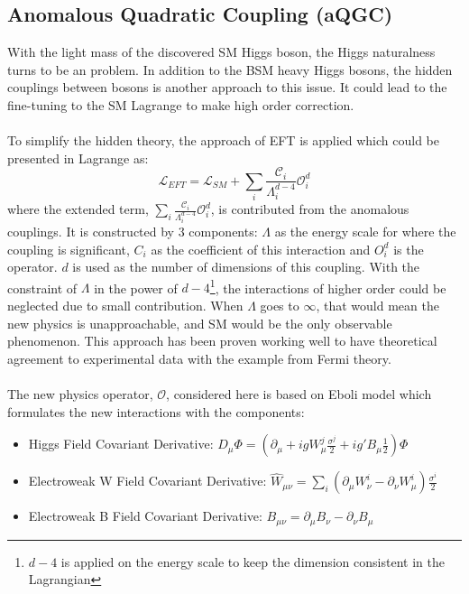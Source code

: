 \subsection{Anomalous Quadratic Coupling (aQGC)}
With the light mass of the discovered SM Higgs boson, the Higgs naturalness turns to be an problem. In addition to the BSM heavy Higgs bosons, the hidden couplings between bosons is another approach to this issue. It could lead to the fine-tuning to the SM Lagrange to make high order correction. 
\\
\\To simplify the hidden theory, the approach of EFT is applied which could be presented in Lagrange as:
\begin{equation}
\mathcal{L}_{EFT} = \mathcal{L}_{SM} + \sum_{i}\frac{\mathcal{C}_i}{\Lambda_{i}^{d-4}}\mathcal{O}^{d}_{i}
\end{equation}
where the extended term, $\sum_{i}\frac{\mathcal{C}_i}{\Lambda_{i}^{d-4}}\mathcal{O}^{d}_{i}$, is contributed from the anomalous couplings. It is constructed by 3 components: $\Lambda$ as the energy scale for where the coupling is significant, $C_{i}$ as the coefficient of this interaction and $O^{d}_i$ is the operator. $d$ is used as the number of dimensions of this coupling. With the constraint of $\Lambda$ in the power of $d-4$\footnote{$d-4$ is applied on the energy scale to keep the dimension consistent in the Lagrangian}, the interactions of higher order could be neglected due to small contribution. When $\Lambda$ goes to $\infty$, that would mean the new physics is unapproachable, and SM would be the only observable phenomenon. This approach has been proven working well to have theoretical agreement to experimental data with the example from Fermi theory. 
\\
\\The new physics operator, $\mathcal{O}$, considered here is based on Eboli model\cite{Eboli:2000ad} which formulates the new interactions with the components:
\begin{itemize}
	\item{Higgs Field Covariant Derivative}: $D_{\mu}\Phi =(\partial_\mu + igW^j_{\mu}\frac{\sigma^{j}}{2}+ig'B_\mu\frac{1}{2})\Phi $
	\item{Electroweak W Field Covariant Derivative}: $\hat{W}_{\mu\nu}=\sum_{i}(\partial_\mu W_\nu^i - \partial_\nu W_\mu^i)\frac{\sigma^i}{2}$
	\item{Electroweak B Field Covariant Derivative}: $B_{\mu\nu} = \partial_\mu B_\nu - \partial_\nu B_\mu$
\end{itemize}
